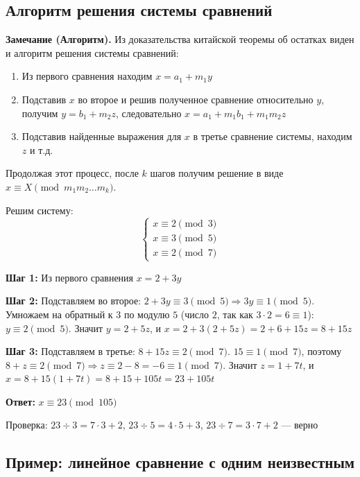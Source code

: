 \documentclass[a4paper,12pt]{article}
\theoremstyle{definition}
\theoremstyle{plain}
\theoremstyle{remark}
\begin{document}
	\subsection{Алгоритм решения системы сравнений}
	
	\noindent \textbf{Замечание (Алгоритм).}
	Из доказательства китайской теоремы об остатках виден и алгоритм решения системы сравнений:
	
	\begin{enumerate}
		\item Из первого сравнения находим $x = a_1 + m_1 y$
		\item Подставив $x$ во второе и решив полученное сравнение относительно $y$, получим $y = b_1 + m_2 z$, следовательно $x = a_1 + m_1 b_1 + m_1 m_2 z$
		\item Подставив найденные выражения для $x$ в третье сравнение системы, находим $z$ и т.д.
	\end{enumerate}
	
	Продолжая этот процесс, после $k$ шагов получим решение в виде $x \equiv X \pmod{m_1 m_2 \dots m_k}$.
	
	\begin{tcolorbox}[colback=gray!5, colframe=gray!50, title=Пример]
		Решим систему:
		\[
		\begin{cases}
			x \equiv 2 \pmod{3} \\
			x \equiv 3 \pmod{5} \\
			x \equiv 2 \pmod{7}
		\end{cases}
		\]
		
		\textbf{Шаг 1:} Из первого сравнения $x = 2 + 3y$
		
		\textbf{Шаг 2:} Подставляем во второе: $2 + 3y \equiv 3 \pmod{5} \Rightarrow 3y \equiv 1 \pmod{5}$.
		Умножаем на обратный к $3$ по модулю $5$ (число $2$, так как $3\cdot2=6\equiv1$): $y \equiv 2 \pmod{5}$.
		Значит $y = 2 + 5z$, и $x = 2 + 3(2+5z) = 2 + 6 + 15z = 8 + 15z$
		
		\textbf{Шаг 3:} Подставляем в третье: $8 + 15z \equiv 2 \pmod{7}$.
		$15 \equiv 1 \pmod{7}$, поэтому $8 + z \equiv 2 \pmod{7} \Rightarrow z \equiv 2 - 8 = -6 \equiv 1 \pmod{7}$.
		Значит $z = 1 + 7t$, и $x = 8 + 15(1+7t) = 8 + 15 + 105t = 23 + 105t$
		
		\textbf{Ответ:} $x \equiv 23 \pmod{105}$
		
		Проверка: $23 \div 3 = 7\cdot3 + 2$, $23 \div 5 = 4\cdot5 + 3$, $23 \div 7 = 3\cdot7 + 2$ — верно
	\end{tcolorbox}
	
	\subsection{Пример: линейное сравнение с одним неизвестным}
	
\end{document}

